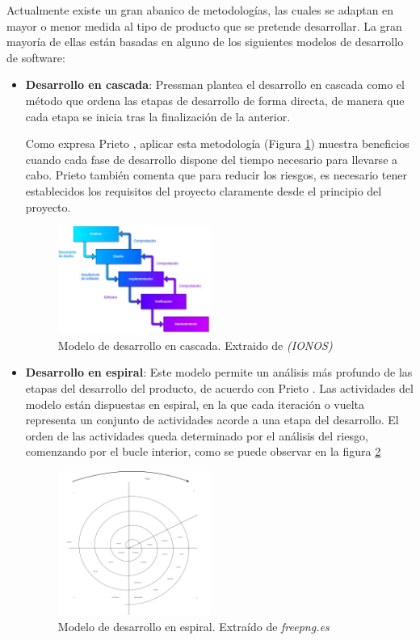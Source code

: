 Actualmente existe un gran abanico de metodologías, las cuales se adaptan en mayor o menor medida al tipo de producto 
que se pretende desarrollar. La gran mayoría de ellas están basadas en alguno de los siguientes modelos de desarrollo 
de software:
\begin{itemize}

    \item \textbf{Desarrollo en cascada}: Pressman \autocite*{Pressman1988} plantea el desarrollo en cascada como el 
    método que ordena las etapas de desarrollo de forma directa, de manera que cada etapa se inicia tras la finalización 
    de la anterior.
    
    Como expresa Prieto \autocite*{PrietoAlvarez2013}, aplicar esta metodología (Figura \ref*{waterfall}) muestra beneficios cuando cada fase de desarrollo 
    dispone del tiempo necesario para llevarse a cabo. Prieto también comenta que para reducir los riesgos, es necesario tener 
    establecidos los requisitos del proyecto claramente desde el principio del proyecto.

    \begin{figure}[H]
        \centering
        \includegraphics[width=5cm]{Figures/modelo_cascada.jpg}
        \caption{Modelo de desarrollo en cascada. Extraido de \textit{(IONOS)}\autocite*{DigitalGuideIONOS2019}}
        \label{waterfall}
    \end{figure}

    \item \textbf{Desarrollo en espiral}: Este modelo permite un análisis más profundo de las etapas del desarrollo del 
    producto, de acuerdo con Prieto \autocite*{PrietoAlvarez2013}. Las actividades del modelo están dispuestas en espiral, en la que cada iteración o vuelta representa 
    un conjunto de actividades acorde a una etapa del desarrollo. El orden de las actividades queda determinado por el 
    análisis del riesgo, comenzando por el bucle interior, como se puede observar en la figura \ref*{spiral} \newpage 


    \begin{figure}[H]
        \centering
        \includegraphics[width=5cm]{Figures/SVG/espiral.png}
        \caption{Modelo de desarrollo en espiral. Extraído de \textit{freepng.es} \autocite*{Espiral}}
        \label{spiral}
    \end{figure}


\end{itemize}
